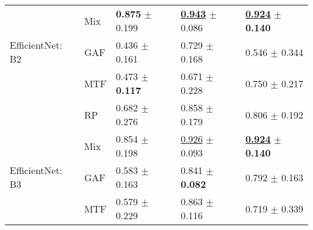 \begin{tabular}[t]{lllll}
 & Mix & \textbf{\textcolor[rgb]{0.0000000000,0.5000000000,0}{0.875}} $\pm$ \textcolor[rgb]{0.4665064146,0.5000000000,0}{0.199} & \underline{\textbf{\textcolor[rgb]{0.0000000000,0.5000000000,0}{0.943}}} $\pm$ \textcolor[rgb]{0.0279362560,0.5000000000,0}{0.086} & \underline{\textbf{\textcolor[rgb]{0.0000000000,0.5000000000,0}{0.924}}} $\pm$ \textbf{\textcolor[rgb]{0.0000000000,0.5000000000,0}{0.140}} \\
EfficientNet: B2 & GAF & \textcolor[rgb]{1.0000000000,0.0000000000,0}{0.436} $\pm$ \textcolor[rgb]{0.2469583423,0.5000000000,0}{0.161} & \textcolor[rgb]{0.7854363535,0.2145636465,0}{0.729} $\pm$ \textcolor[rgb]{0.5902943363,0.4097056637,0}{0.168} & \textcolor[rgb]{1.0000000000,0.0000000000,0}{0.546} $\pm$ \textcolor[rgb]{1.0000000000,0.0000000000,0}{0.344} \\
 & MTF & \textcolor[rgb]{0.9165707710,0.0834292290,0}{0.473} $\pm$ \textbf{\textcolor[rgb]{0.0000000000,0.5000000000,0}{0.117}} & \textcolor[rgb]{1.0000000000,0.0000000000,0}{0.671} $\pm$ \textcolor[rgb]{1.0000000000,0.0000000000,0}{0.228} & \textcolor[rgb]{0.4601226994,0.5000000000,0}{0.750} $\pm$ \textcolor[rgb]{0.3761612393,0.5000000000,0}{0.217} \\
 & RP & \textcolor[rgb]{0.4401611047,0.5000000000,0}{0.682} $\pm$ \textcolor[rgb]{0.8992700104,0.1007299896,0}{0.276} & \textcolor[rgb]{0.3122568093,0.5000000000,0}{0.858} $\pm$ \textcolor[rgb]{0.6588583971,0.3411416029,0}{0.179} & \textcolor[rgb]{0.3128834356,0.5000000000,0}{0.806} $\pm$ \textcolor[rgb]{0.2583340082,0.5000000000,0}{0.192} \\
 & Mix & \textcolor[rgb]{0.0474683544,0.5000000000,0}{0.854} $\pm$ \textcolor[rgb]{0.4597706474,0.5000000000,0}{0.198} & \underline{\textcolor[rgb]{0.0612840467,0.5000000000,0}{0.926}} $\pm$ \textcolor[rgb]{0.0757608281,0.5000000000,0}{0.093} & \underline{\textbf{\textcolor[rgb]{0.0000000000,0.5000000000,0}{0.924}}} $\pm$ \textbf{\textcolor[rgb]{0.0000000000,0.5000000000,0}{0.140}} \\
EfficientNet: B3 & GAF & \textcolor[rgb]{0.6645569620,0.3354430380,0}{0.583} $\pm$ \textcolor[rgb]{0.2594721826,0.5000000000,0}{0.163} & \textcolor[rgb]{0.3747081712,0.5000000000,0}{0.841} $\pm$ \textbf{\textcolor[rgb]{0.0000000000,0.5000000000,0}{0.082}} & \textcolor[rgb]{0.3496932515,0.5000000000,0}{0.792} $\pm$ \textcolor[rgb]{0.1148593217,0.5000000000,0}{0.163} \\
 & MTF & \textcolor[rgb]{0.6740506329,0.3259493671,0}{0.579} $\pm$ \textcolor[rgb]{0.6342803047,0.3657196953,0}{0.229} & \textcolor[rgb]{0.2951639800,0.5000000000,0}{0.863} $\pm$ \textcolor[rgb]{0.2289898021,0.5000000000,0}{0.116} & \textcolor[rgb]{0.5429447853,0.4570552147,0}{0.719} $\pm$ \textcolor[rgb]{0.9763816031,0.0236183969,0}{0.339} \\

\end{tabular}

